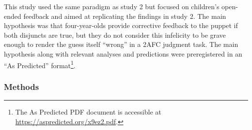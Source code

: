 \documentclass[floatsintext,man]{apa6}
\theoremstyle{definition}
\theoremstyle{definition}
\theoremstyle{definition}
\theoremstyle{remark}
\begin{document}
This study used the same paradigm as study 2 but focused on children's
open-ended feedback and aimed at replicating the findings in study 2.
The main hypothesis was that four-year-olds provide corrective feedback
to the puppet if both disjuncts are true, but they do not consider this
infelicity to be grave enough to render the guess itself \enquote{wrong}
in a 2AFC judgment task. The main hypothesis along with relevant
analyses and predictions were preregistered in an \enquote{As Predicted}
format\footnote{The As Predicted PDF document is accessible at
  \url{https://aspredicted.org/x9ez2.pdf}.}.

\subsubsection{Methods}\label{methods-2}
\end{document}
